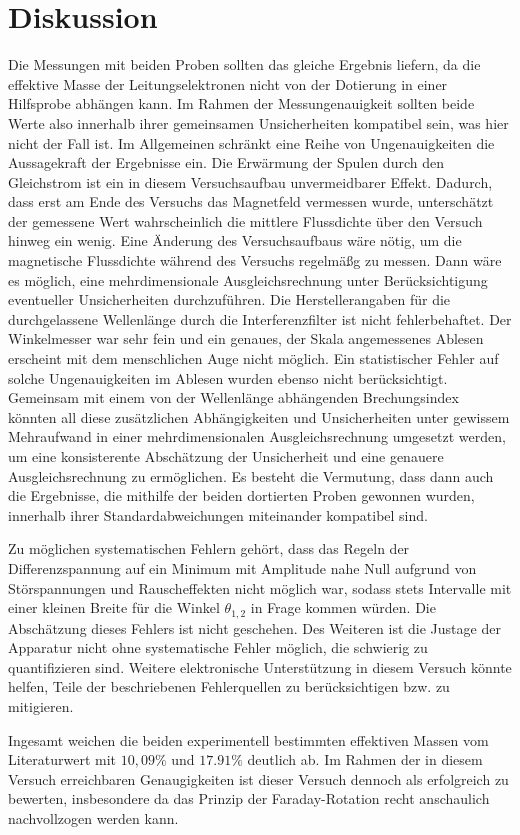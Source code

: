 \section{Diskussion}
\label{sec:Diskussion}

Die Messungen mit beiden Proben sollten das gleiche Ergebnis liefern, da die effektive Masse der Leitungselektronen nicht von der Dotierung in einer Hilfsprobe abhängen kann. Im Rahmen der Messungenauigkeit sollten beide Werte also innerhalb ihrer gemeinsamen Unsicherheiten kompatibel sein, was hier nicht der Fall ist. Im Allgemeinen schränkt eine Reihe von Ungenauigkeiten die Aussagekraft der Ergebnisse ein. Die Erwärmung der Spulen durch den Gleichstrom ist ein in diesem Versuchsaufbau unvermeidbarer Effekt. Dadurch, dass erst am Ende des Versuchs das Magnetfeld vermessen wurde, unterschätzt der gemessene Wert wahrscheinlich die mittlere Flussdichte über den Versuch hinweg ein wenig. Eine Änderung des Versuchsaufbaus wäre nötig, um die magnetische Flussdichte während des Versuchs regelmäßg zu messen. Dann wäre es möglich, eine mehrdimensionale Ausgleichsrechnung unter Berücksichtigung eventueller Unsicherheiten durchzuführen. Die Herstellerangaben für die durchgelassene Wellenlänge durch die Interferenzfilter ist nicht fehlerbehaftet. Der Winkelmesser war sehr fein und ein genaues, der Skala angemessenes Ablesen erscheint mit dem menschlichen Auge nicht möglich. Ein statistischer Fehler auf solche Ungenauigkeiten im Ablesen wurden ebenso nicht berücksichtigt.
Gemeinsam mit einem von der Wellenlänge abhängenden Brechungsindex könnten all diese zusätzlichen Abhängigkeiten und Unsicherheiten unter gewissem Mehraufwand in einer mehrdimensionalen Ausgleichsrechnung umgesetzt werden, um eine konsisterente Abschätzung der Unsicherheit und eine genauere Ausgleichsrechnung zu ermöglichen. Es besteht die Vermutung, dass dann auch die Ergebnisse, die mithilfe der beiden dortierten Proben gewonnen wurden, innerhalb ihrer Standardabweichungen miteinander kompatibel sind.

Zu möglichen systematischen Fehlern gehört, dass das Regeln der Differenzspannung auf ein Minimum mit Amplitude nahe Null aufgrund von Störspannungen und Rauscheffekten nicht möglich war, sodass stets Intervalle mit einer kleinen Breite für die Winkel $\theta_{1,2}$ in Frage kommen würden. Die Abschätzung dieses Fehlers ist nicht geschehen. Des Weiteren ist die Justage der Apparatur nicht ohne systematische Fehler möglich, die schwierig zu quantifizieren sind. Weitere elektronische Unterstützung in diesem Versuch könnte helfen, Teile der beschriebenen Fehlerquellen zu berücksichtigen bzw. zu mitigieren.

Ingesamt weichen die beiden experimentell bestimmten effektiven Massen vom Literaturwert mit $10{,}09\%$ und $17.91\%$ deutlich ab. Im Rahmen der in diesem Versuch erreichbaren Genaugigkeiten ist dieser Versuch dennoch als erfolgreich zu bewerten, insbesondere da das Prinzip der Faraday-Rotation recht anschaulich nachvollzogen werden kann.
